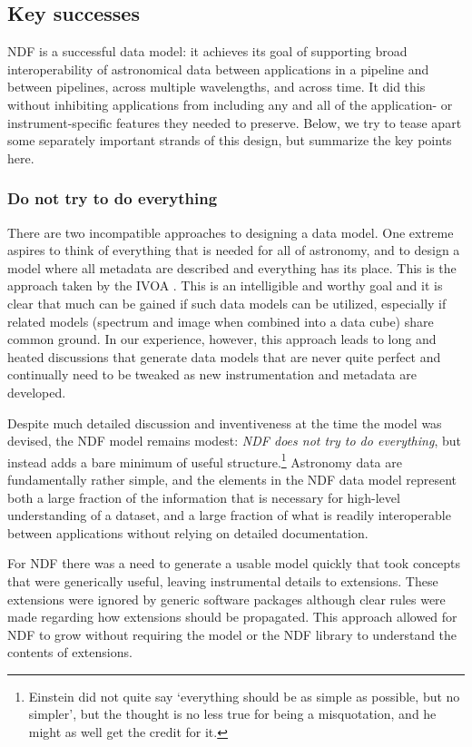 \documentclass[final,authoryear,5p,times,twocolumn]{elsarticle}
\begin{document}
\subsection{Key successes}
\label{sec:success}

NDF is a successful data model: it achieves its goal of supporting
broad interoperability of astronomical data between applications in a
pipeline and between pipelines, across multiple wavelengths, and
across time.  It did this without inhibiting applications from
including any and all of the application- or instrument-specific
features they needed to preserve.  Below, we try to tease apart some
separately important strands of this design, but summarize the key
points here.

\subsubsection{Do not try to do everything}

There are two incompatible approaches to designing a data model. One
extreme aspires to think of everything that is needed for
all of astronomy, and to design a model where all metadata are
described and everything has its place. This is the approach taken by
the IVOA \citep[see e.g.][]{2012arXiv1204.3055M}. This is an
intelligible and worthy goal and it is clear that
much can be gained if such data models can be utilized, especially if
related models (spectrum and image when combined into a data cube)
share common ground.  In our experience, however, this approach leads to long and
heated discussions that generate data models that are never quite
perfect and continually need to be tweaked as new instrumentation and
metadata are developed.

Despite much detailed discussion and inventiveness at the time the
model was devised, the NDF model remains modest: \emph{NDF does not
  try to do everything}, but instead adds a bare minimum of useful
structure.\footnote{Einstein did not quite say `everything should be
  as simple as possible, but no simpler', but the thought is no less
  true for being a misquotation, and he might as well get the credit
  for it.}  Astronomy data are fundamentally rather simple, and the
elements in the NDF data model represent both a large fraction of the
information that is necessary for high-level understanding of a
dataset, and a large fraction of what is readily interoperable between
applications without relying on detailed documentation.

For NDF there was a need to generate a usable model quickly that took
concepts that were generically useful, leaving instrumental details to
extensions. These extensions were ignored by generic software packages
although clear rules were made regarding how extensions should be
propagated. This approach allowed for NDF to grow without
requiring the model or the NDF library to understand the
contents of extensions.
\end{document}
